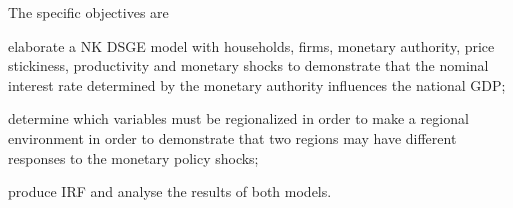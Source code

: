 \documentclass[
thesis.tex
]{subfiles}
\begin{document}
	The specific objectives are 
	\begin{enumerate*}[label=(\arabic*)]
		\item elaborate a NK DSGE model with households, firms, monetary authority, price stickiness, productivity and monetary shocks to demonstrate that the nominal interest rate determined by the monetary authority influences the national GDP; 
		\item determine which variables must be regionalized in order to make a regional environment in order to demonstrate that two regions may have different responses to the monetary policy shocks; 
		\item produce IRF and analyse the results of both models.
	\end{enumerate*}	
\end{document}
